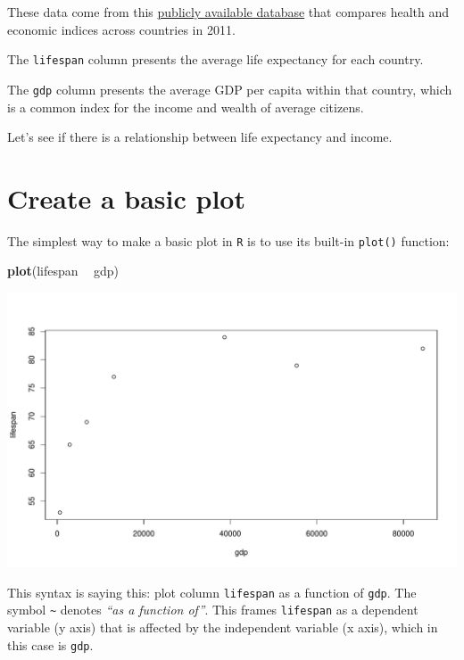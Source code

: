 \documentclass[
]{book}
\newenvironment{Shaded}{\begin{snugshade}}{\end{snugshade}}
\newcommand{\KeywordTok}[1]{\textcolor[rgb]{0.13,0.29,0.53}{\textbf{#1}}}
\newcommand{\NormalTok}[1]{#1}
\newcommand{\OperatorTok}[1]{\textcolor[rgb]{0.81,0.36,0.00}{\textbf{#1}}}
\newcommand{\StringTok}[1]{\textcolor[rgb]{0.31,0.60,0.02}{#1}}
\begin{document}
These data come from this \href{https://datasets.iisg.amsterdam/dataset.xhtml?persistentId=hdl:10622/LKYT53}{publicly available database} that compares health and economic indices across countries in 2011.

The \texttt{lifespan} column presents the average life expectancy for each country.

The \texttt{gdp} column presents the average GDP per capita within that country, which is a common index for the income and wealth of average citizens.

Let's see if there is a relationship between life expectancy and income.

\hypertarget{create-a-basic-plot}{%
\section*{Create a basic plot}\label{create-a-basic-plot}}

The simplest way to make a basic plot in \texttt{R} is to use its built-in \texttt{plot()} function:

\begin{Shaded}
\begin{Highlighting}[]
\KeywordTok{plot}\NormalTok{(lifespan }\OperatorTok{~}\StringTok{ }\NormalTok{gdp)}
\end{Highlighting}
\end{Shaded}

\includegraphics{figures/unnamed-chunk-98-1.pdf}

This syntax is saying this: plot column \texttt{lifespan} as a function of \texttt{gdp}. The symbol \texttt{\textasciitilde{}} denotes \emph{``as a function of''}. This frames \texttt{lifespan} as a dependent variable (y axis) that is affected by the independent variable (x axis), which in this case is \texttt{gdp}.
\end{document}
